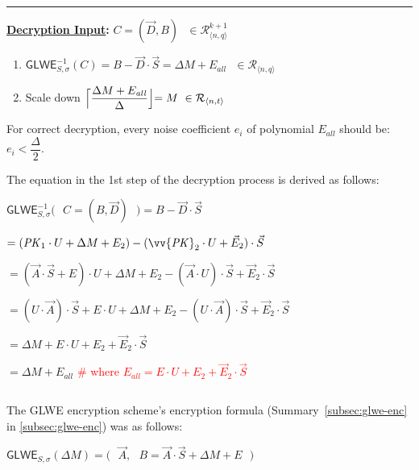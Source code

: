 \begin{tcolorbox}[title={\textbf{\tboxlabel{\ref*{subsec:glwe-enc}} GLWE Public Key Encryption}}]
\begin{enumerate}
\end{enumerate}


\par\noindent\rule{\textwidth}{0.4pt}

\textbf{\underline{Decryption Input}:} $C = (\vec{D}, B) \text{ } \in \mathcal{R}_{\langle n,q \rangle}^{k + 1}$

\begin{enumerate}
\item $\textsf{GLWE}^{-1}_{S,\sigma}(C) = B - \vec{D} \cdot \vec{S} = \Delta  M + E_{\mathit{all}} \text{ } \in \mathcal{R}_{\langle n,q \rangle}$

\item Scale down 
$\Bigl\lceil \dfrac{ \Delta  M + E_{\mathit{all}} }{\Delta}\Bigl\rfloor = M  \text{ } \in \mathcal{R}_{\langle n, t \rangle}$

\end{enumerate}

For correct decryption, every noise coefficient $e_i$ of polynomial $E_\mathit{all}$ should be: $e_i < \dfrac{\Delta}{2}$.

\end{tcolorbox}


The equation in the 1st step of the decryption process is derived as follows:

$\textsf{GLWE}^{-1}_{S,\sigma}\bm{(}\text{ } C = (B, \vec{D}) \text{ }\bm{)} = B - \vec{D}\cdot\vec{S}$

$ = (\mathit{PK}_1\cdot U + \Delta  M + E_2) - (\vv{\mathit{PK}}_2 \cdot U + \vec{E}_2)\cdot \vec{S} $

$=  (\vec{A} \cdot \vec{S} + E)\cdot U + \Delta M + E_2 - (\vec{A}\cdot U)\cdot \vec{S} + \vec{E}_2\cdot\vec{S}$

$=  (U\cdot\vec{A}) \cdot \vec{S} + E \cdot U + \Delta M + E_2 - (U\cdot \vec{A}) \cdot \vec{S} + \vec{E}_2\cdot\vec{S}$

$= \Delta M + E \cdot U + E_2 + \vec{E}_2\cdot\vec{S}$

$= \Delta M + E_{\mathit{all}}$ \textcolor{red}{\text{ } \# where $E_{\mathit{all}} = E \cdot U + E_2 + \vec{E}_2\cdot\vec{S}$} 


$ $

 The GLWE encryption scheme's encryption formula (Summary~\ref{subsec:glwe-enc} in \autoref{subsec:glwe-enc}) was as follows: 

$\textsf{GLWE}_{S, \sigma}(\Delta M) = \bm{(} \text{ } \vec{A}, \text{ } B = \vec{A}\cdot\vec{S} + \Delta M + E \text{ }\bm{)}$

